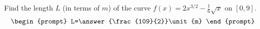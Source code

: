 \documentclass{ximera}
\author{Gregory Hartman \and Matthew Carr}
\begin{document}
\begin{exercise}





Find the length $L$ (in terms of $\unit{m}$) of the curve $f(x)=2x^{3/2}-\frac{1}{6}\sqrt{x}$ on $[0,9]$.
\[
\begin{prompt}
L=\answer{\frac{109}{2}}\unit{m}
\end{prompt}
\]




\end{exercise}
\end{document}
